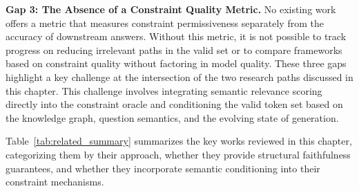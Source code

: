 \textbf{Gap 3: The Absence of a Constraint Quality Metric.} No existing work offers a metric that measures constraint permissiveness separately from the accuracy of downstream answers. Without this metric, it is not possible to track progress on reducing irrelevant paths in the valid set or to compare frameworks based on constraint quality without factoring in model quality. These three gaps highlight a key challenge at the intersection of the two research paths discussed in this chapter. This challenge involves integrating semantic relevance scoring directly into the constraint oracle and conditioning the valid token set based on the knowledge graph, question semantics, and the evolving state of generation.

Table~\ref{tab:related_summary} summarizes the key works reviewed in this chapter, categorizing them by their approach, whether they provide structural faithfulness guarantees, and whether they incorporate semantic conditioning into their constraint mechanisms.
\newpage

